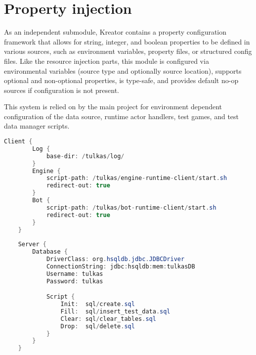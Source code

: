 	
	
	\section{Property injection}
	
	As an independent submodule, Kreator contains a property configuration framework that allows for string, integer, and boolean properties to be defined in various sources, such as environment variables, property files, or structured config files. Like the resource injection parts, this module is configured via environmental variables (source type and optionally source location), supports optional and non-optional properties, is type-safe, and provides default no-op sources if configuration is not present.
	
	This system is relied on by the main project for environment dependent configuration of the data source, runtime actor handlers, test games, and test data manager scripts.
	
		\begin{center}
			\begin{minipage}{13.5cm}
		\begin{lstlisting}[language=Java, title={\emph{Sample config} --- \code{tulkas.conf}}]
	Client {
		Log {
			base-dir: /tulkas/log/
		}
		Engine {
        	script-path: /tulkas/engine-runtime-client/start.sh
        	redirect-out: true
		}
		Bot {
        	script-path: /tulkas/bot-runtime-client/start.sh
        	redirect-out: true
    	}
	}
	
	Server {
		Database {
        	DriverClass: org.hsqldb.jdbc.JDBCDriver
        	ConnectionString: jdbc:hsqldb:mem:tulkasDB
        	Username: tulkas
        	Password: tulkas

        	Script {
            	Init:  sql/create.sql
            	Fill:  sql/insert_test_data.sql
            	Clear: sql/clear_tables.sql
            	Drop:  sql/delete.sql
        	}
    	}
	}
		\end{lstlisting}
			\end{minipage}
		\end{center}
		
